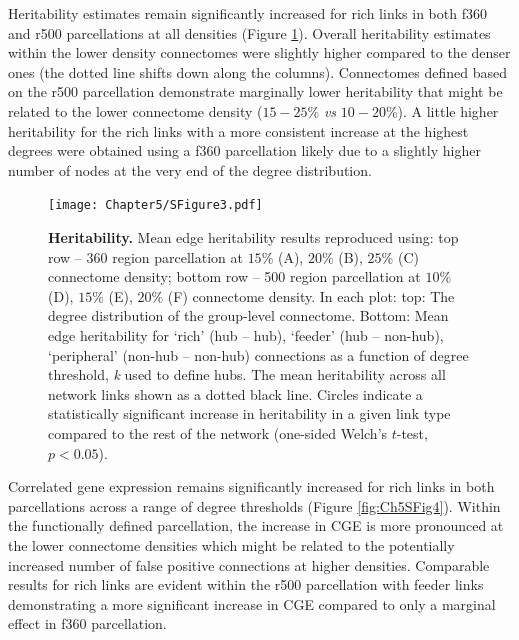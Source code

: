 \clearpage
Heritability estimates remain significantly increased for rich links in both f360 and r500 parcellations at all densities (Figure \ref{fig:Ch5SFig3}). Overall heritability estimates within the lower density connectomes were slightly higher compared to the denser ones (the dotted line shifts down along the columns). Connectomes defined based on the r500 parcellation demonstrate marginally lower heritability that might be related to the lower connectome density ($15-25\%$ \textit{vs} $10-20\%$). A little higher heritability for the rich links with a more consistent increase at the highest degrees were obtained using a f360 parcellation likely due to a slightly higher number of nodes at the very end of the degree distribution. 

\begin{figure}[h!]
\begin{center}
\texttt{[image: Chapter5/SFigure3.pdf]}%
\end{center}
\caption{\textbf{Heritability.} 
Mean edge heritability results reproduced using: top row -- 360 region parcellation at $15\%$ (A), $20\%$ (B), $25\%$ (C) connectome density; bottom row -- 500 region parcellation at $10\%$ (D), $15\%$ (E), $20\%$ (F) connectome density. In each plot: top: The degree distribution of the group-level connectome. Bottom: Mean edge heritability for `rich' (hub -- hub), `feeder' (hub -- non-hub), `peripheral' (non-hub -- non-hub) connections as a function of degree threshold, \textit{k} used to define hubs. The mean heritability across all network links shown as a dotted black line. Circles indicate a statistically significant increase in heritability in a given link type compared to the rest of the network (one-sided Welch's $t$-test, $p < 0.05$).}
\label{fig:Ch5SFig3}
\end{figure}

\clearpage
Correlated gene expression remains significantly increased for rich links in both parcellations across a range of degree thresholds (Figure \ref{fig:Ch5SFig4}). Within the functionally defined parcellation, the increase in CGE is more pronounced at the lower connectome densities which might be related to the potentially increased number of false positive connections at higher densities. Comparable results for rich links are evident within the r500 parcellation with feeder links demonstrating a more significant increase in CGE compared to only a marginal effect in f360 parcellation. 

